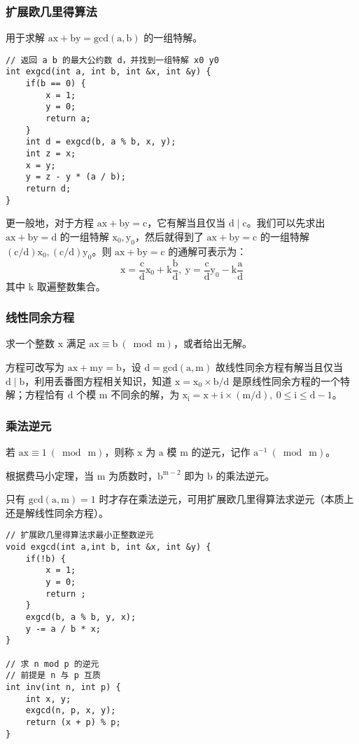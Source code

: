 \documentclass[UTF8]{article}
\begin{document}
\subsubsection{扩展欧几里得算法}
用于求解 $\mathrm{ax + by = gcd(a,b)}$ 的一组特解。
\begin{lstlisting}[caption=扩展欧几里得算法]
// 返回 a b 的最大公约数 d，并找到一组特解 x0 y0
int exgcd(int a, int b, int &x, int &y) {
	if(b == 0) {
		x = 1;
		y = 0;
		return a;
	}
	int d = exgcd(b, a % b, x, y);
	int z = x;
	x = y;
	y = z - y * (a / b);
	return d;
}
\end{lstlisting}
更一般地，对于方程 $\mathrm{ax + by = c}$，它有解当且仅当 $\mathrm{d \mid c}$。我们可以先求出 $\mathrm{ax + by = d}$ 的一组特解 $\mathrm{x_0, y_0}$，然后就得到了 $\mathrm{ax + by = c}$ 的一组特解 $\mathrm{(c/d)x_0, (c/d)y_0}$。则 $\mathrm{ax + by = c}$ 的通解可表示为：
$$
\mathrm{x = \frac{c}{d}x_0 + k\frac{b}{d},\ y = \frac{c}{d}y_0 - k\frac{a}{d}}
$$
其中 $\mathrm{k}$ 取遍整数集合。


\subsubsection{线性同余方程}
求一个整数 $\mathrm{x}$ 满足 $\mathrm{ax \equiv b\ (\bmod m) }$，或者给出无解。

方程可改写为 $\mathrm{ax + my = b}$，设 $\mathrm{d = gcd(a,m)}$ 故线性同余方程有解当且仅当 $\mathrm{d \mid b}$，利用丢番图方程相关知识，知道 $\mathrm{x = x_0 \times b / d}$ 是原线性同余方程的一个特解；方程恰有 $\mathrm{d}$ 个模 $\mathrm{m}$ 不同余的解，为 $\mathrm{x_i = x + i \times (m/d), \ 0 \le i \le d - 1}$。


\subsubsection{乘法逆元}
若 $\mathrm{ax \equiv 1 \ (\bmod\  m)}$，则称 $\mathrm{x}$ 为 $\mathrm{a}$ 模 $\mathrm{m}$ 的逆元，记作 $\mathrm{a^{-1}\  (\bmod \ m)}$。

根据费马小定理，当 $\mathrm{m}$ 为质数时，$\mathrm{b^{m - 2}}$ 即为 $\mathrm{b}$ 的乘法逆元。 

只有 $\mathrm{gcd(a,m) = 1}$ 时才存在乘法逆元，可用扩展欧几里得算法求逆元（本质上还是解线性同余方程）。
\begin{lstlisting}[caption=乘法逆元]
// 扩展欧几里得算法求最小正整数逆元
void exgcd(int a,int b, int &x, int &y) {
	if(!b) {
		x = 1;
		y = 0;
		return ;
	}
	exgcd(b, a % b, y, x);
	y -= a / b * x;
}

// 求 n mod p 的逆元
// 前提是 n 与 p 互质
int inv(int n, int p) {
	int x, y;
	exgcd(n, p, x, y);
	return (x + p) % p;
}
\end{lstlisting}
\end{document}
